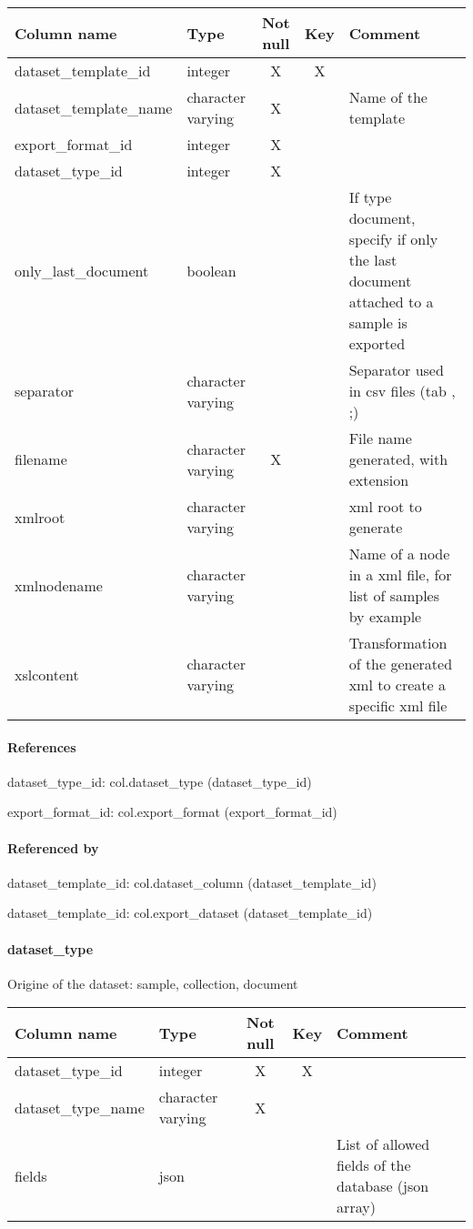 \begin{tabular}{|l| p{2cm}|c|c| p{5cm}|}
\hline
Column name & Type & Not null & Key & Comment \\
\hline
dataset\_template\_id & integer & X & X & \\
dataset\_template\_name & character varying & X &  & Name of the template\\
export\_format\_id & integer & X &  & \\
dataset\_type\_id & integer & X &  & \\
only\_last\_document & boolean &  &  & If type document, specify if only the last document attached to a sample is exported\\
separator & character varying &  &  & Separator used in csv files (tab , ;)\\
filename & character varying & X &  & File name generated, with extension\\
xmlroot & character varying &  &  & xml root to generate\\
xmlnodename & character varying &  &  & Name of a node in a xml file, for list of samples by example\\
xslcontent & character varying &  &  & Transformation of the generated xml to create a specific xml file\\
\hline
\end{tabular}
\paragraph{References}
dataset\_type\_id: col.dataset\_type (dataset\_type\_id)

export\_format\_id: col.export\_format (export\_format\_id)

\paragraph{Referenced by}
dataset\_template\_id: col.dataset\_column (dataset\_template\_id)

dataset\_template\_id: col.export\_dataset (dataset\_template\_id)

\paragraph{dataset\_type}
Origine of the dataset: sample, collection, document

\begin{tabular}{|l| p{2cm}|c|c| p{5cm}|}
\hline
Column name & Type & Not null & Key & Comment \\
\hline
dataset\_type\_id & integer & X & X & \\
dataset\_type\_name & character varying & X &  & \\
fields & json &  &  & List of allowed fields of the database (json array)\\
\hline
\end{tabular}

